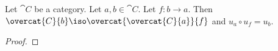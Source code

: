 \begin{lemma}
Let $\cat{C}$ be a category.
Let $a,b\in \cat{C}$.
Let $f:b\rightarrow a$.
Then $\overcat{C}{b} \iso \overcat{\overcat{C}{a}}{f}$ and
$u_a \circ u_f = u_b$.
\end{lemma}
\begin{proof}

\end{proof}